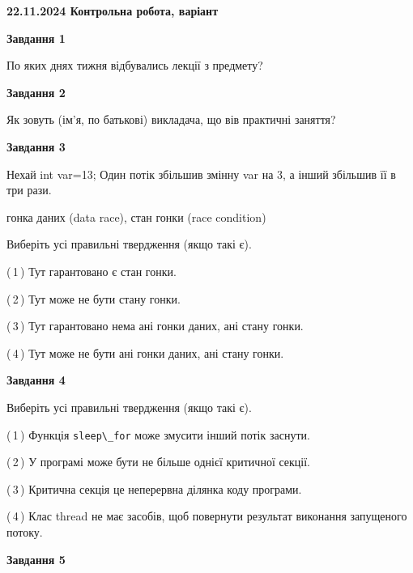 \documentclass[12pt, ukrainian]{article}
\def\code#1{\Verb!#1!}
\begin{document}
\begin {large}

\textbf{22.11.2024 Контрольна робота, варіант  }\par


{

\begin{center}
\textbf{Завдання 1}
\end{center}

По яких днях тижня відбувались лекції з предмету?


\begin{center}
\textbf{Завдання 2}
\end{center}

Як зовуть (ім'я, по батькові) викладача, що вів практичні заняття?


\begin{center}
\textbf{Завдання 3}
\end{center}

Нехай int var=13; Один потік збільшив змінну var на 3, а інший збільшив її в три рази.

гонка даних (data race), стан гонки (race condition)

Виберіть усі правильні твердження (якщо такі є).\par
\vspace{2mm}
(\,1\,) Тут гарантовано є стан гонки.%

(\,2\,) Тут може не бути стану гонки.%

(\,3\,) Тут гарантовано нема ані гонки даних, ані стану гонки.%

(\,4\,) Тут може не бути ані гонки даних, ані стану гонки.%


\begin{center}
\textbf{Завдання 4}
\end{center}

Виберіть усі правильні твердження (якщо такі є).\par
\vspace{2mm}

(\,1\,) Функція \code{sleep\_for} може змусити інший потік заснути.%

(\,2\,) У програмі може бути не більше однієї критичної секції.%

(\,3\,) Критична секція це неперервна ділянка коду програми.%

(\,4\,) Клас thread не має засобів, щоб повернути результат виконання запущеного потоку.%


\begin{center}
\textbf{Завдання 5}
\end{center}

}
\end{large}
\end{document}
